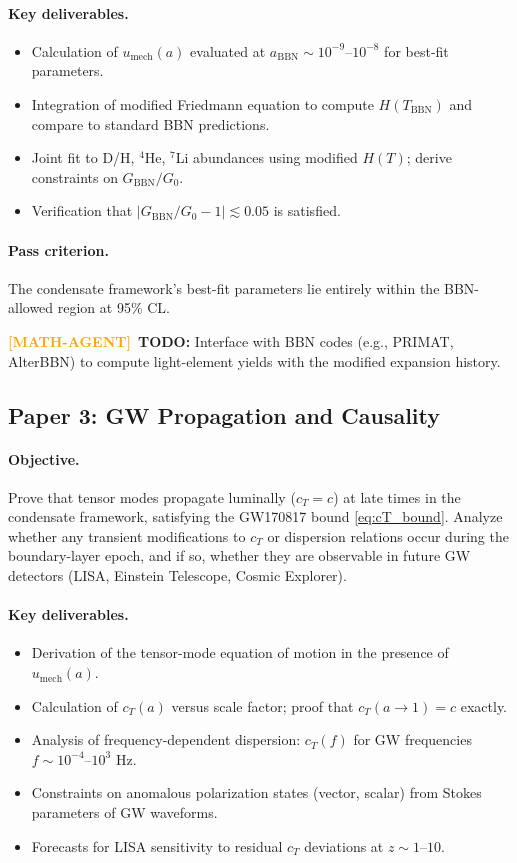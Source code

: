 \documentclass[11pt,a4paper]{article}
\newcommand{\umech}{u_{\mathrm{mech}}}
\theoremstyle{definition}
\newcommand{\MATHAGENT}{\textcolor{orange}{\textbf{[MATH-AGENT]}}}
\begin{document}
\paragraph{Key deliverables.}
\begin{itemize}[leftmargin=1.8em]
  \item Calculation of $\umech(a)$ evaluated at $a_{\mathrm{BBN}} \sim 10^{-9}$--$10^{-8}$ for best-fit parameters.
  \item Integration of modified Friedmann equation to compute $H(T_{\mathrm{BBN}})$ and compare to standard BBN predictions.
  \item Joint fit to D/H, $^4$He, $^7$Li abundances using modified $H(T)$; derive constraints on $G_{\mathrm{BBN}}/G_0$.
  \item Verification that $|G_{\mathrm{BBN}}/G_0 - 1| \lesssim 0.05$ is satisfied.
\end{itemize}

\paragraph{Pass criterion.}
The condensate framework's best-fit parameters lie entirely within the BBN-allowed region at 95\% CL.

\MATHAGENT~\textbf{TODO:} Interface with BBN codes (e.g., PRIMAT, AlterBBN) to compute light-element yields with the modified expansion history.

\subsection{Paper 3: GW Propagation and Causality}
\label{sec:paper3}

\paragraph{Objective.}
Prove that tensor modes propagate luminally ($c_T = c$) at late times in the condensate framework, satisfying the GW170817 bound \eqref{eq:cT_bound}. Analyze whether any transient modifications to $c_T$ or dispersion relations occur during the boundary-layer epoch, and if so, whether they are observable in future GW detectors (LISA, Einstein Telescope, Cosmic Explorer).

\paragraph{Key deliverables.}
\begin{itemize}[leftmargin=1.8em]
  \item Derivation of the tensor-mode equation of motion in the presence of $\umech(a)$.
  \item Calculation of $c_T(a)$ versus scale factor; proof that $c_T(a \to 1) = c$ exactly.
  \item Analysis of frequency-dependent dispersion: $c_T(f)$ for GW frequencies $f \sim 10^{-4}$--$10^3$ Hz.
  \item Constraints on anomalous polarization states (vector, scalar) from Stokes parameters of GW waveforms.
  \item Forecasts for LISA sensitivity to residual $c_T$ deviations at $z \sim 1$--$10$.
\end{itemize}
\end{document}
